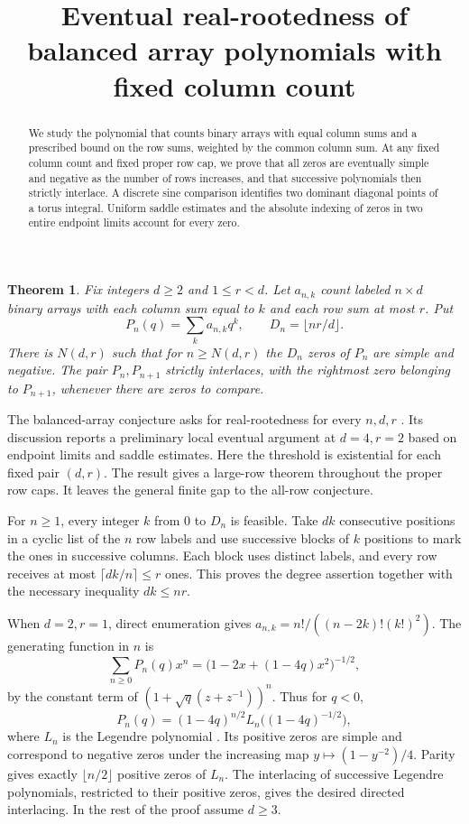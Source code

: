 \documentclass[11pt]{article}
\title{Eventual real-rootedness of balanced array polynomials with fixed column count}
\makeatletter
\newtheorem{theorem}{Theorem}
\renewcommand{\maketitle}{%
  \begingroup
  \centering\LARGE\@title\par
  \endgroup
  \vspace{0.4\baselineskip}}
\makeatother
\begin{document}
\maketitle

\begin{abstract}
We study the polynomial that counts binary arrays with equal column
sums and a prescribed bound on the row sums, weighted by the common
column sum. At any fixed column count and fixed proper row cap, we prove
that all zeros are eventually simple and negative as the number of rows
increases, and that successive polynomials then strictly interlace.
A discrete sine comparison identifies two dominant diagonal points of a
torus integral. Uniform saddle estimates and the absolute indexing of
zeros in two entire endpoint limits account for every zero.
\end{abstract}

\begin{theorem}\label{thm:main}
Fix integers \(d\ge2\) and \(1\le r<d\). Let \(a_{n,k}\) count labeled
\(n\times d\) binary arrays with each column sum equal to \(k\) and each
row sum at most \(r\). Put
\[
P_n(q)=\sum_k a_{n,k}q^k,\qquad D_n=\lfloor nr/d\rfloor.
\]
There is \(N(d,r)\) such that for \(n\ge N(d,r)\) the \(D_n\) zeros of
\(P_n\) are simple and negative. The pair \(P_n,P_{n+1}\) strictly
interlaces, with the rightmost zero belonging to \(P_{n+1}\), whenever
there are zeros to compare.
\end{theorem}

The balanced-array conjecture asks for real-rootedness for every
\(n,d,r\) \cite{balanced}. Its discussion reports a preliminary local
eventual argument at \(d=4,r=2\) based on endpoint limits and saddle
estimates. Here the threshold is existential for each fixed pair
\((d,r)\). The result gives a large-row theorem throughout the proper
row caps. It leaves the general finite gap to the all-row conjecture.

For \(n\ge1\), every integer \(k\) from \(0\) to \(D_n\) is feasible.
Take \(dk\) consecutive positions in a cyclic list of the \(n\) row
labels and use successive blocks of \(k\) positions to mark the ones in
successive columns. Each block uses distinct labels, and every row
receives at most \(\lceil dk/n\rceil\le r\) ones. This proves the
degree assertion together with the necessary inequality \(dk\le nr\).

When \(d=2,r=1\), direct enumeration gives
\(a_{n,k}=n!/((n-2k)!(k!)^2)\).
The generating function in \(n\) is
\[
\sum_{n\ge0}P_n(q)x^n=\big(1-2x+(1-4q)x^2\big)^{-1/2},
\]
by the constant term of \((1+\sqrt q(z+z^{-1}))^n\).
Thus for \(q<0\),
\[
P_n(q)=(1-4q)^{n/2}L_n\big((1-4q)^{-1/2}\big),
\]
where \(L_n\) is the Legendre polynomial \cite{dlmf}.
Its positive zeros are simple and correspond to negative zeros
under the increasing map \(y\mapsto(1-y^{-2})/4\).
Parity gives exactly \(\lfloor n/2\rfloor\) positive zeros of \(L_n\).
The interlacing of successive Legendre polynomials, restricted to
their positive zeros, gives the desired directed interlacing.
In the rest of the proof assume \(d\ge3\).
\end{document}
